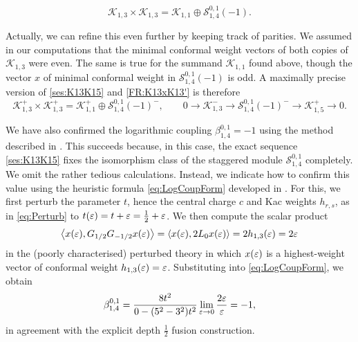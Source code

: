 \documentclass[a4paper,reqno,12pt]{report}
\theoremstyle{definition}
\numberwithin{equation}{section}
\let\originalleft\left     %
\let\originalright\right
\renewcommand{\left}{\mathopen{}\mathclose\bgroup\originalleft}
\renewcommand{\right}{\aftergroup\egroup\originalright}
\newcommand{\func}[2]{#1 \left( #2 \right)} %
\newcommand{\brac}[1]{\left( #1 \right)}
\newcommand{\inner}[2]{\left\langle #1 , #2 \right\rangle} %
\newcommand{\ra}{\rightarrow}
\newcommand{\lra}{\longrightarrow}
\newcommand{\Kac}[1]{\mathcal{K}_{#1}}       %
\newcommand{\Stag}[2]{\mathcal{S}_{#1}^{#2}} %
\newcommand{\logcoup}[2]{\beta_{#1}^{#2}}    %
\newcommand{\fuse}{\mathbin{\times}}                                            %
\newcommand{\dses}[5]{0 \lra #1 \overset{#2}{\lra} #3 \overset{#4}{\lra} #5 \lra 0} %
\newcommand{\hw}{highest-weight}
\newcommand{\hws}{\hw{} vector}
\newcommand{\eps}{\varepsilon}
\theoremstyle{plain}
\begin{document}
\begin{equation} \label{FR:K13xK13'}
\Kac{1,3} \fuse \Kac{1,3} = \Kac{1,1} \oplus \Stag{1,4}{0,1}(-1).
\end{equation}

Actually, we can refine this even further by keeping track of parities.  We assumed in our computations that the minimal conformal weight vectors of both copies of $\Kac{1,3}$ were even.  The same is true for the summand $\Kac{1,1}$ found above, though the vector $x$ of minimal conformal weight in $\Stag{1,4}{0,1}(-1)$ is odd.  A maximally precise version of \eqref{ses:K13K15} and \eqref{FR:K13xK13'} is therefore
\begin{equation}
\Kac{1,3}^+ \fuse \Kac{1,3}^+ = \Kac{1,1}^+ \oplus \Stag{1,4}{0,1}(-1)^-, \qquad
\dses{\Kac{1,3}^-}{}{\Stag{1,4}{0,1}(-1)^-}{}{\Kac{1,5}^+}.
\end{equation}

We have also confirmed the logarithmic coupling $\logcoup{1,4}{0,1} = -1$ using the method described in \cite{RidLog07}.  This succeeds because, in this case, the exact sequence \eqref{ses:K13K15} fixes the isomorphism class of the staggered module $\Stag{1,4}{0,1}$ completely.   We omit the rather tedious calculations.  Instead, we indicate how to confirm this value using the heuristic formula \eqref{eq:LogCoupForm} developed in \cite{VasInd11}.  For this, we first perturb the parameter $t$, hence the central charge $c$ and Kac weights $h_{r,s}$, as in \eqref{eq:Perturb} to $\func{t}{\eps} = t + \eps = \frac{1}{2} + \eps$.  We then compute the scalar product
\begin{equation}
\inner{\func{x}{\eps}}{G_{1/2} G_{-1/2} \func{x}{\eps}} = \inner{\func{x}{\eps}}{2 L_0 \func{x}{\eps}} = 2 \func{h_{1,3}}{\eps} = 2 \eps
\end{equation}
in the (poorly characterised) perturbed theory in which $\func{x}{\eps}$ is a \hws{} of conformal weight $\func{h_{1,3}}{\eps} = \eps$.  Substituting into \eqref{eq:LogCoupForm}, we obtain
\begin{equation}
\logcoup{1,4}{0,1} = \frac{8t^2}{0 - \brac{5^2-3^2} t^2} \lim_{\eps \ra 0} \frac{2 \eps}{\eps} = -1,
\end{equation}
in agreement with the explicit depth $\frac{1}{2}$ fusion construction.
\end{document}

